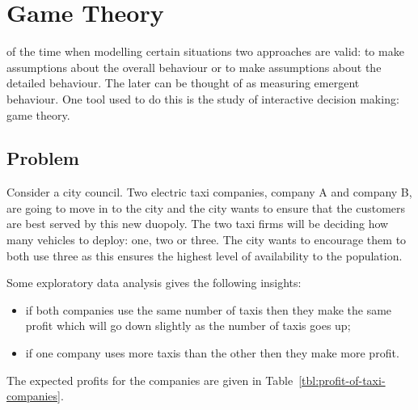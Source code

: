 \chapter[Game Theory]{Game Theory}\label{chp:game_theory}

 of the time when modelling certain situations two
approaches are valid: to make assumptions about the overall behaviour or to make
assumptions about the detailed behaviour. The later can be thought of as
measuring emergent behaviour. One tool used to do this is the study of
interactive decision making: game theory.

\section{Problem}\label{sec:game_theory_problem}

Consider a city council. Two electric taxi companies, company A and company B,
are going to move
in to the city and the city wants to ensure that the customers are best served
by this new duopoly. The two taxi firms will be deciding how many vehicles to
deploy: one, two or three. The city wants to encourage them to both use three as
this ensures the highest level of availability to the population.

Some exploratory data analysis gives the following insights:

\begin{itemize}
    \item if both companies use the same number of taxis then they make the same
        profit which will go down slightly as the number of taxis goes up;
    \item if one company uses more taxis than the other then they make more
        profit.
\end{itemize}

The expected profits for the companies are given in
Table~\ref{tbl:profit-of-taxi-companies}.

